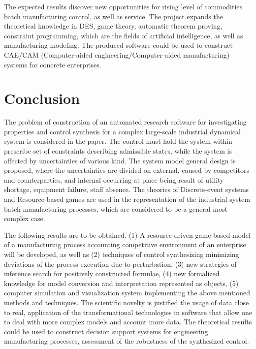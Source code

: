\documentclass[conference]{IEEEtran}
\begin{document}
The expected results discover new opportunities for rising level of commodities batch manufacturing control, as well as service. The project expands the theoretical knowledge in DES, game theory, automatic theorem proving, constraint programming, which are the fields of artificial intelligence, as well as manufacturing modeling. The produced software could be used to construct CAE/CAM (Computer-aided engineering/Computer-aided manufacturing) systems for concrete enterprises.

\section{Conclusion}
\label{sec:conc}

The problem of construction of an automated research software for investigating properties and control synthesis for a complex large-scale industrial dynamical system is considered in the paper.  The control must hold the system within prescribe set of constraints describing admissible states, while the system is affected by uncertainties of various kind.  The system model general design is proposed, where the uncertainties are divided on external, caused by competitors and counterparties, and internal occurring at place being result of utility shortage, equipment failure, staff absence.  The theories of Discrete-event systems and Resource-based games are used in the representation of the industrial system batch manufacturing processes, which are considered to be a general most complex case.

The following results are to be obtained. (1) A resource-driven game based model of a manufacturing process accounting competitive environment of an enterprise will be developed, as well as (2) techniques of control synthesizing minimizing deviations of the process execution due to perturbation, (3) new strategies of inference search for positively constructed formulae, (4) new formalized knowledge for model conversion and interpretation represented as objects, (5) computer simulation and visualization system implementing the above mentioned methods and techniques. The scientific novelty is justified the usage of data close to real, application of the transformational technologies in software that allow one to deal with more complex models and account more data. The theoretical results could be used to construct decision support systems for engineering manufacturing processes, assessment of the robustness of the synthesized control.
\end{document}

